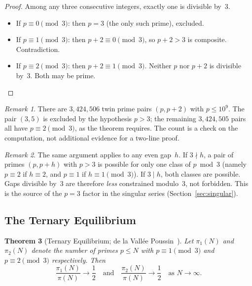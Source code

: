 \documentclass[12pt,a4paper]{article}
\theoremstyle{plain}
\newtheorem{theorem}{Theorem}[section]
\theoremstyle{definition}
\theoremstyle{remark}
\newtheorem{remark}[theorem]{Remark}
\begin{document}
\begin{proof}
Among any three consecutive integers, exactly one is divisible by~3.
\begin{itemize}
  \item If $p \equiv 0 \pmod{3}$: then $p = 3$ (the only such prime), excluded.
  \item If $p \equiv 1 \pmod{3}$: then $p + 2 \equiv 0 \pmod{3}$, so $p + 2 > 3$ is
    composite. Contradiction.
  \item If $p \equiv 2 \pmod{3}$: then $p + 2 \equiv 1 \pmod{3}$. Neither $p$ nor
    $p + 2$ is divisible by~3. Both may be prime. \qedhere
\end{itemize}
\end{proof}

\begin{remark}
There are $3{,}424{,}506$ twin prime pairs $(p, p+2)$ with $p \leq 10^9$. The pair
$(3,5)$ is excluded by the hypothesis $p > 3$; the remaining $3{,}424{,}505$ pairs all
have $p \equiv 2 \pmod 3$, as the theorem requires. The count is a check on the
computation, not additional evidence for a two-line proof.
\end{remark}

\begin{remark}
\label{rem:gaps-mod3}
The same argument applies to any even gap~$h$. If $3 \nmid h$, a pair of primes
$(p, p+h)$ with $p > 3$ is possible for only one class of $p \bmod 3$ (namely
$p \equiv 2$ if $h \equiv 2$, and $p \equiv 1$ if $h \equiv 1 \pmod 3$). If $3 \mid h$,
both classes are possible. Gaps divisible by~3 are therefore \emph{less} constrained
modulo~3, not forbidden. This is the source of the $p = 3$ factor in the singular series
(Section~\ref{sec:singular}).
\end{remark}

\subsection{The Ternary Equilibrium}

\begin{theorem}[Ternary Equilibrium; de la Vall\'ee Poussin~\cite{dlVP96}]
\label{thm:equilibrium}
Let $\pi_1(N)$ and $\pi_2(N)$ denote the number of primes $p \leq N$ with
$p \equiv 1 \pmod{3}$ and $p \equiv 2 \pmod{3}$ respectively. Then
\[
  \frac{\pi_1(N)}{\pi(N)} \to \frac{1}{2} \quad \text{and} \quad
  \frac{\pi_2(N)}{\pi(N)} \to \frac{1}{2} \quad \text{as } N \to \infty.
\]
\end{theorem}
\end{document}
